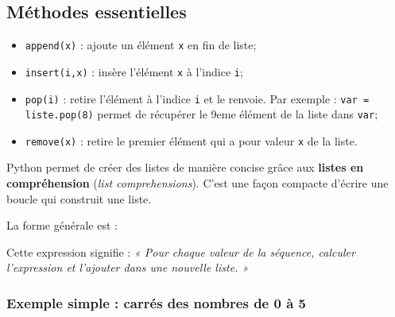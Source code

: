 \documentclass[11pt]{article}
\begin{document}
		\subsection*{Méthodes essentielles}
		
		\begin{itemize}
			\item \texttt{append(x)} : ajoute un élément \texttt{x} en fin de liste;
			\item \texttt{insert(i,x)} : insère l'élément \texttt{x} à l’indice \texttt{i};
			\item \texttt{pop(i)} : retire l'élément à l’indice \texttt{i} et le renvoie. Par exemple : \texttt{var = liste.pop(8)} permet de récupérer le 9eme élément de la liste dans \texttt{var};
			\item \texttt{remove(x)} : retire le premier élément qui a pour valeur \texttt{x} de la liste.
		\end{itemize}
		
		
		
		Python permet de créer des listes de manière concise grâce aux \textbf{listes en compréhension}
		(\textit{list comprehensions}).  
		C’est une façon compacte d’écrire une boucle qui construit une liste.
		
		La forme générale est :
		
		\begin{center}
		\end{center}
		
		Cette expression signifie :  
		\textit{« Pour chaque valeur de la séquence, calculer l’expression et l’ajouter dans une nouvelle liste. »}
		
		\medskip
		
		\subsubsection*{Exemple simple : carrés des nombres de 0 à 5}
		
\end{document}
